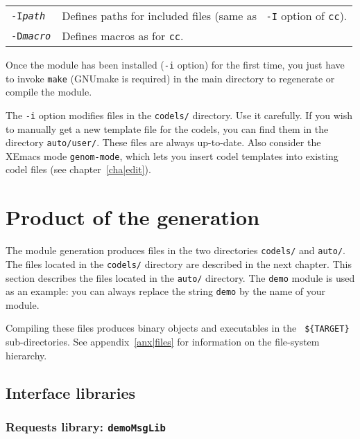 \begin{description}
\begin{tabularx}{\linewidth}{lX}
{\tt -I{\em path}} & Defines paths for included files (same as {\tt
-I} option of {\tt cc}).\\

{\tt -D{\em macro}} & Defines macros as for {\tt cc}.\\
\end{tabularx}

Once the module has been installed ({\tt -i} option)  for the first time,
you just   have to invoke {\tt make}   (GNUmake is required)  in the main
directory to regenerate or compile the module.

The {\tt -i} option modifies files in the {\tt codels/} directory. Use it
carefully.  If you wish  to manually  get a  new   template file for  the
codels, you can find them in the directory {\tt auto/user/}.  These files
are always  up-to-date. Also consider the  XEmacs  mode {\tt genom-mode},
which lets  you  insert codel templates  into  existing codel files  (see
chapter~\ref{cha|edit}).

\end{description}


\section{Product of the generation}

The module generation produces files in the two directories {\tt codels/}
and {\tt auto/}.  The files located  in the  {\tt codels/}  directory are
described in the next chapter.  This  section describes the files located
in  the  {\tt auto/} directory.   The {\tt  demo} module   is  used as an
example: you can always replace the string {\tt demo} by the name of your
module.

Compiling these files produces binary objects and executables in the {\tt
\$\{TARGET\}} sub-\-directories. See appendix~\ref{anx|files} for
information on the file-system hierarchy.

\subsection{Interface libraries}

\subsubsection{Requests library: {\tt demoMsgLib}}

